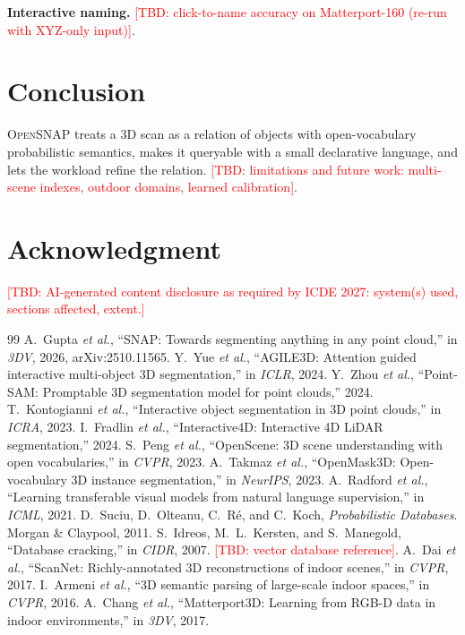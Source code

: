 \documentclass[conference]{IEEEtran}
\newcommand{\TBD}[1]{\textcolor{red}{[TBD: #1]}}
\newcommand{\sys}{\textsc{OpenSNAP}}
\begin{document}
\textbf{Interactive naming.} \TBD{click-to-name accuracy on Matterport-160 (re-run with XYZ-only input)}.

\section{Conclusion}
\sys{} treats a 3D scan as a relation of objects with open-vocabulary probabilistic semantics, makes it queryable with
a small declarative language, and lets the workload refine the relation. \TBD{limitations and future work: multi-scene
indexes, outdoor domains, learned calibration}.

\section*{Acknowledgment}
\TBD{AI-generated content disclosure as required by ICDE 2027: system(s) used, sections affected, extent.}


\begin{thebibliography}{99}
 A.~Gupta \emph{et al.}, ``SNAP: Towards segmenting anything in any point cloud,'' in \emph{3DV}, 2026, arXiv:2510.11565.
 Y.~Yue \emph{et al.}, ``AGILE3D: Attention guided interactive multi-object 3D segmentation,'' in \emph{ICLR}, 2024.
 Y.~Zhou \emph{et al.}, ``Point-SAM: Promptable 3D segmentation model for point clouds,'' 2024.
 T.~Kontogianni \emph{et al.}, ``Interactive object segmentation in 3D point clouds,'' in \emph{ICRA}, 2023.
 I.~Fradlin \emph{et al.}, ``Interactive4D: Interactive 4D LiDAR segmentation,'' 2024.
 S.~Peng \emph{et al.}, ``OpenScene: 3D scene understanding with open vocabularies,'' in \emph{CVPR}, 2023.
 A.~Takmaz \emph{et al.}, ``OpenMask3D: Open-vocabulary 3D instance segmentation,'' in \emph{NeurIPS}, 2023.
 A.~Radford \emph{et al.}, ``Learning transferable visual models from natural language supervision,'' in \emph{ICML}, 2021.
 D.~Suciu, D.~Olteanu, C.~R\'e, and C.~Koch, \emph{Probabilistic Databases}. Morgan \& Claypool, 2011.
 S.~Idreos, M.~L.~Kersten, and S.~Manegold, ``Database cracking,'' in \emph{CIDR}, 2007.
 \TBD{vector database reference}.
 A.~Dai \emph{et al.}, ``ScanNet: Richly-annotated 3D reconstructions of indoor scenes,'' in \emph{CVPR}, 2017.
 I.~Armeni \emph{et al.}, ``3D semantic parsing of large-scale indoor spaces,'' in \emph{CVPR}, 2016.
 A.~Chang \emph{et al.}, ``Matterport3D: Learning from RGB-D data in indoor environments,'' in \emph{3DV}, 2017.
\end{thebibliography}
\end{document}
